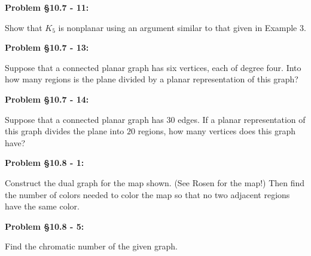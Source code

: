 \documentclass{article}
\newenvironment{problem}[1]
    {\begin{mdframed}[default]
    \textbf{Problem #1:}
    }
    {\end{mdframed}
    }
\begin{document}
\begin{problem}{\S 10.7 - 11}
Show that $K_5$ is nonplanar using an argument similar to that given in Example 3.
\end{problem}

\begin{problem}{\S 10.7 - 13}
Suppose that a connected planar graph has six vertices, each of degree four. Into how many regions is the plane divided by a planar representation of this graph?
\end{problem}

\begin{problem}{\S 10.7 - 14}
Suppose that a connected planar graph has $30$ edges. If a planar representation of this graph divides the plane into $20$ regions, how many vertices does this graph have?
\end{problem}

\begin{problem}{\S 10.8 - 1}
Construct the dual graph for the map shown. (See Rosen for the map!) Then find the number of colors needed to color the map so that no two adjacent regions have the same color.
\end{problem}

\begin{problem}{\S 10.8 - 5}
Find the chromatic number of the given graph.

\begin{center}
\end{center}
\end{problem}
\end{document}
